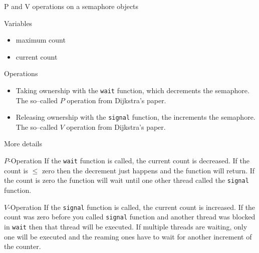 \documentclass[12pt,t]{beamer}
\begin{document}
\begin{frame}{P and V operations on a semaphore objects}

\begin{block}{Variables}
\begin{itemize}
\item maximum count
\item current count
\end{itemize}
\end{block}

\begin{block}{Operations}
\begin{itemize}
\item Taking ownership with the \lstinline|wait| function, which decrements the semaphore. The so--called $P$ operation from Dijkstra's paper.
\item Releasing ownership with the \lstinline|signal| function, the increments the semaphore. The so--called $V$ operation from Dijkstra's paper.
\end{itemize}
\end{block}

\end{frame}

\begin{frame}{More details}

\begin{block}{$P$-Operation}
If the \lstinline|wait| function is called, the current count is decreased. If the count is $\leq$ zero then the decrement just happens and the function will return. If the count is zero the function will wait until one other thread called the  \lstinline|signal| function.
\end{block}

\begin{block}{$V$-Operation}
If the \lstinline|signal| function is called, the current count is increased. If the count was zero before you called \lstinline|signal| function and another thread was blocked in \lstinline|wait| then that thread will be executed. If multiple threads are waiting, only one will be executed and the reaming ones have to wait for another increment of the counter.
\end{block}

\end{frame}
\end{document}
